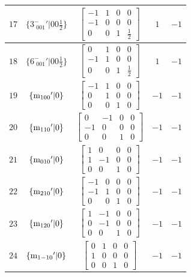 \documentclass[fleqn,8pt]{jsarticle}
\begin{document}
\begin{longtable}{ccccc}
$ 17 $ & $ \{3^{-}_{\,\,001}{}'|0 0 \frac{1}{2}\} $ & $ \begin{bmatrix} -1 & 1 & 0 & 0 \\ -1 & 0 & 0 & 0 \\ 0 & 0 & 1 & \frac{1}{2} \end{bmatrix} $ & $ 1 $ & $ -1 $ \\ \hline
$ 18 $ & $ \{6^{-}_{\,\,001}{}'|0 0 \frac{1}{2}\} $ & $ \begin{bmatrix} 0 & 1 & 0 & 0 \\ -1 & 1 & 0 & 0 \\ 0 & 0 & 1 & \frac{1}{2} \end{bmatrix} $ & $ 1 $ & $ -1 $ \\ \hline
$ 19 $ & $ \{{\rm m}_{100}{}'|0\} $ & $ \begin{bmatrix} -1 & 1 & 0 & 0 \\ 0 & 1 & 0 & 0 \\ 0 & 0 & 1 & 0 \end{bmatrix} $ & $ -1 $ & $ -1 $ \\ \hline
$ 20 $ & $ \{{\rm m}_{110}{}'|0\} $ & $ \begin{bmatrix} 0 & -1 & 0 & 0 \\ -1 & 0 & 0 & 0 \\ 0 & 0 & 1 & 0 \end{bmatrix} $ & $ -1 $ & $ -1 $ \\ \hline
$ 21 $ & $ \{{\rm m}_{010}{}'|0\} $ & $ \begin{bmatrix} 1 & 0 & 0 & 0 \\ 1 & -1 & 0 & 0 \\ 0 & 0 & 1 & 0 \end{bmatrix} $ & $ -1 $ & $ -1 $ \\ \hline
$ 22 $ & $ \{{\rm m}_{210}{}'|0\} $ & $ \begin{bmatrix} -1 & 0 & 0 & 0 \\ -1 & 1 & 0 & 0 \\ 0 & 0 & 1 & 0 \end{bmatrix} $ & $ -1 $ & $ -1 $ \\ \hline
$ 23 $ & $ \{{\rm m}_{120}{}'|0\} $ & $ \begin{bmatrix} 1 & -1 & 0 & 0 \\ 0 & -1 & 0 & 0 \\ 0 & 0 & 1 & 0 \end{bmatrix} $ & $ -1 $ & $ -1 $ \\ \hline
$ 24 $ & $ \{{\rm m}_{1-10}{}'|0\} $ & $ \begin{bmatrix} 0 & 1 & 0 & 0 \\ 1 & 0 & 0 & 0 \\ 0 & 0 & 1 & 0 \end{bmatrix} $ & $ -1 $ & $ -1 $ \\
\end{longtable}
\end{document}
